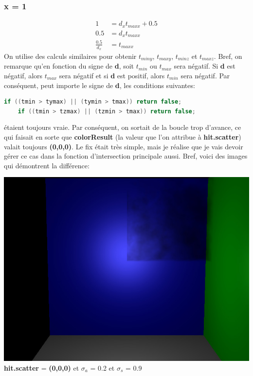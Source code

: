 \documentclass{article}
\begin{document}
\subsubsection*{x = 1}
\begin{align*}
    1 &= d_xt_{maxx} + 0.5 \\
    0.5 &= d_xt_{maxx} \\
    \frac{0.5}{d_x} &= t_{maxx}
\end{align*}
\noindent\makebox[\linewidth]{\rule{\textwidth}{0.4pt}}
On utilise des calculs similaires pour obtenir $t_{miny}$, $t_{maxy}$, $t_{minz}$ et $t_{maxz}$. Bref, on remarque qu'en fonction du signe de \textbf{d}, soit $t_{min}$ ou $t_{max}$ sera négatif. Si \textbf{d} est négatif, alors $t_{max}$ sera négatif et si \textbf{d} est positif, alors $t_{min}$ sera négatif. Par conséquent, peut importe le signe de \textbf{d}, les conditions suivantes:
\begin{lstlisting}[language=C++]
    if ((tmin > tymax) || (tymin > tmax)) return false;
    if ((tmin > tzmax) || (tzmin > tmax)) return false;
\end{lstlisting}
étaient toujours vraie. Par conséquent, on sortait de la boucle trop d'avance, ce qui faisait en sorte que \textbf{colorResult} (la valeur que l'on attribue à \textbf{hit.scatter}) valait toujours \textbf{(0,0,0)}. Le fix était très simple, mais je réalise que je vais devoir gérer ce cas dans la fonction d'intersection principale aussi. Bref, voici des images qui démontrent la différence:
\begin{center}
    \includegraphics[scale=0.5]{no_scatter_abs020_scat090.jpg} \\
    \textbf{hit.scatter} = \textbf{(0,0,0)} et $\sigma_a$ = 0.2 et $\sigma_s$ = 0.9
\end{center}
\end{document}
